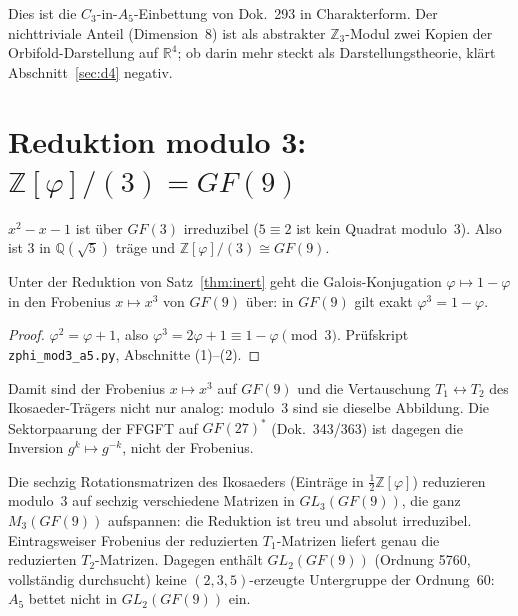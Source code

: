 Dies ist die $C_3$-in-$A_5$-Einbettung von Dok.~293 in Charakterform.
Der nichttriviale Anteil (Dimension~8) ist als abstrakter
$\mathbb{Z}_3$-Modul zwei Kopien der Orbifold-Darstellung auf $\mathbb{R}^4$;
ob darin mehr steckt als Darstellungstheorie, klärt Abschnitt~\ref{sec:d4}
negativ.

\section[{Reduktion modulo 3: Z[phi]/(3) = GF(9)}]{Reduktion modulo 3: $\mathbb{Z}[\varphi]/(3)=GF(9)$}

\begin{theorem}\label{thm:inert}
$x^2-x-1$ ist über $GF(3)$ irreduzibel ($5\equiv2$ ist kein Quadrat
modulo~3). Also ist $3$ in $\mathbb{Q}(\sqrt5)$ träge und
$\mathbb{Z}[\varphi]/(3)\cong GF(9)$.
\end{theorem}

\begin{theorem}\label{thm:frob}
Unter der Reduktion von Satz~\ref{thm:inert} geht die Galois-Konjugation
$\varphi\mapsto1-\varphi$ in den Frobenius $x\mapsto x^3$ von $GF(9)$ über:
in $GF(9)$ gilt exakt $\varphi^3=1-\varphi$.
\end{theorem}

\begin{proof}
$\varphi^2=\varphi+1$, also $\varphi^3=2\varphi+1\equiv1-\varphi\pmod3$.
Prüfskript \texttt{zphi\_mod3\_a5.py}, Abschnitte (1)--(2).
\end{proof}

Damit sind der Frobenius $x\mapsto x^3$ auf $GF(9)$ und die Vertauschung
$T_1\leftrightarrow T_2$ des Ikosaeder-Trägers nicht nur analog: modulo~3 sind sie
dieselbe Abbildung. Die Sektorpaarung der FFGFT auf $GF(27)^*$ (Dok.~343/363) ist
dagegen die Inversion $g^k\mapsto g^{-k}$, nicht der Frobenius.

\begin{theorem}[$A_5$ über $GF(9)$, \EM/\BM]\label{thm:a5gf9}
Die sechzig Rotationsmatrizen des Ikosaeders (Einträge in
$\tfrac12\mathbb{Z}[\varphi]$) reduzieren modulo~3 auf sechzig verschiedene
Matrizen in $GL_3(GF(9))$, die ganz $M_3(GF(9))$ aufspannen: die Reduktion
ist treu und absolut irreduzibel. Eintragsweiser Frobenius der reduzierten
$T_1$-Matrizen liefert genau die reduzierten $T_2$-Matrizen.
Dagegen enthält $GL_2(GF(9))$ (Ordnung 5760, vollständig durchsucht) keine
$(2,3,5)$-erzeugte Untergruppe der Ordnung~60: $A_5$ bettet nicht in
$GL_2(GF(9))$ ein.
\end{theorem}

